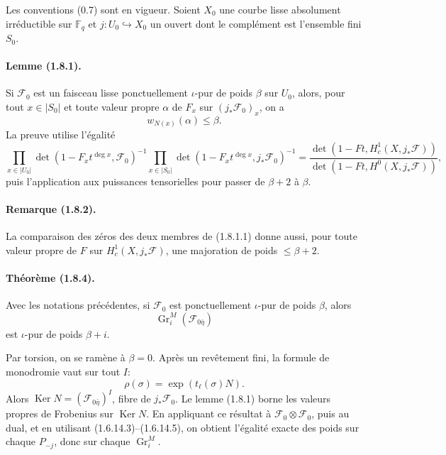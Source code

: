 \documentclass[11pt]{article}
\theoremstyle{remark}
\newcommand{\Fq}{\mathbb{F}_q}
\newcommand{\Gr}{\operatorname{Gr}}
\newcommand{\Ker}{\operatorname{Ker}}
\begin{document}
Les conventions (0.7) sont en vigueur. Soient $X_0$ une courbe lisse absolument irréductible sur $\Fq$ et $j:U_0\hookrightarrow X_0$ un ouvert dont le complément est l'ensemble fini $S_0$.

\paragraph{Lemme (1.8.1).}
Si $\mathcal F_0$ est un faisceau lisse ponctuellement $\iota$-pur de poids $\beta$ sur $U_0$, alors, pour tout $x\in |S_0|$ et toute valeur propre $\alpha$ de $F_x$ sur $(j_*\mathcal F_0)_x$, on a
\[
w_{N(x)}(\alpha)\le\beta.
\]
La preuve utilise l'égalité
\begin{equation}\tag{1.8.1.1}
\prod_{x\in |U_0|}\det(1-F_x t^{\deg x},\mathcal F_0)^{-1}
\prod_{x\in |S_0|}\det(1-F_x t^{\deg x},j_*\mathcal F_0)^{-1}
=
\frac{\det(1-Ft,H^1_c(X,j_*\mathcal F))}
{\det(1-Ft,H^0(X,j_*\mathcal F))},
\end{equation}
puis l'application aux puissances tensorielles pour passer de $\beta+2$ à $\beta$.

\paragraph{Remarque (1.8.2).}
La comparaison des zéros des deux membres de (1.8.1.1) donne aussi, pour toute valeur propre de $F$ sur $H^1_c(X,j_*\mathcal F)$, une majoration de poids $\le\beta+2$.

\paragraph{Théorème (1.8.4).}
Avec les notations précédentes, si $\mathcal F_0$ est ponctuellement $\iota$-pur de poids $\beta$, alors
\[
\Gr^M_i(\mathcal F_{0\bar\eta})
\]
est $\iota$-pur de poids $\beta+i$.

Par torsion, on se ramène à $\beta=0$. Après un revêtement fini, la formule de monodromie vaut sur tout $I$:
\[
\rho(\sigma)=\exp(t_\ell(\sigma)N).
\]
Alors $\Ker N=(\mathcal F_{0\bar\eta})^I$, fibre de $j_*\mathcal F_0$. Le lemme (1.8.1) borne les valeurs propres de Frobenius sur $\Ker N$. En appliquant ce résultat à $\mathcal F_0\otimes\mathcal F_0$, puis au dual, et en utilisant (1.6.14.3)--(1.6.14.5), on obtient l'égalité exacte des poids sur chaque $P_{-j}$, donc sur chaque $\Gr^M_i$.
\end{document}
